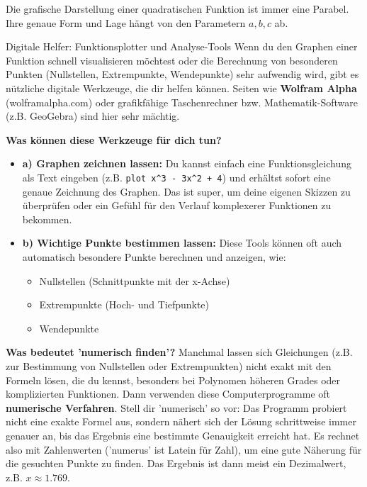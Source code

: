 Die grafische Darstellung einer quadratischen Funktion ist immer eine Parabel. Ihre genaue Form und Lage hängt von den Parametern $a, b, c$ ab.

\begin{infoboxumgebung}{Digitale Helfer: Funktionsplotter und Analyse-Tools}
Wenn du den Graphen einer Funktion schnell visualisieren möchtest oder die Berechnung von besonderen Punkten (Nullstellen, Extrempunkte, Wendepunkte) sehr aufwendig wird, gibt es nützliche digitale Werkzeuge, die dir helfen können. Seiten wie \textbf{Wolfram Alpha} (wolframalpha.com) oder grafikfähige Taschenrechner bzw. Mathematik-Software (z.B. GeoGebra) sind hier sehr mächtig.

\textbf{Was können diese Werkzeuge für dich tun?}
\begin{itemize}
    \item \textbf{a) Graphen zeichnen lassen:} Du kannst einfach eine Funktionsgleichung als Text eingeben (z.B. \verb|plot x^3 - 3x^2 + 4|) und erhältst sofort eine genaue Zeichnung des Graphen. Das ist super, um deine eigenen Skizzen zu überprüfen oder ein Gefühl für den Verlauf komplexerer Funktionen zu bekommen.
    \item \textbf{b) Wichtige Punkte bestimmen lassen:} Diese Tools können oft auch automatisch besondere Punkte berechnen und anzeigen, wie:
    \begin{itemize}
        \item Nullstellen (Schnittpunkte mit der x-Achse)
        \item Extrempunkte (Hoch- und Tiefpunkte)
        \item Wendepunkte
    \end{itemize}
\end{itemize}

\textbf{Was bedeutet 'numerisch finden'?}
Manchmal lassen sich Gleichungen (z.B. zur Bestimmung von Nullstellen oder Extrempunkten) nicht exakt mit den Formeln lösen, die du kennst, besonders bei Polynomen höheren Grades oder komplizierten Funktionen. Dann verwenden diese Computerprogramme oft \textbf{numerische Verfahren}.
Stell dir 'numerisch' so vor: Das Programm probiert nicht eine exakte Formel aus, sondern nähert sich der Lösung schrittweise immer genauer an, bis das Ergebnis eine bestimmte Genauigkeit erreicht hat. Es rechnet also mit Zahlenwerten ('numerus' ist Latein für Zahl), um eine gute Näherung für die gesuchten Punkte zu finden. Das Ergebnis ist dann meist ein Dezimalwert, z.B. $x \approx 1.769$.


\end{infoboxumgebung}
